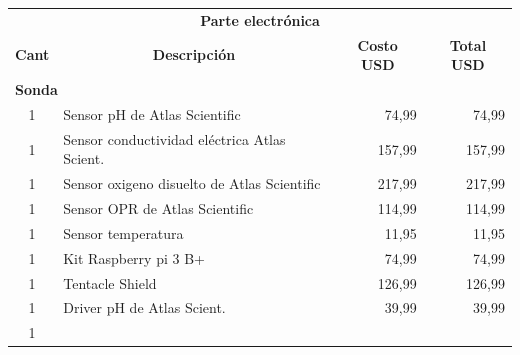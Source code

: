 \begin{table}[t]
\begin{tabular}{c l c c}
\hline
\multicolumn{4}{c}{\textbf{Parte electrónica}}  \\
\multicolumn{1}{r}{\textbf{Cant}}                 & 
\multicolumn{1}{c}{\textbf{Descripción}}           & 
\multicolumn{1}{c}{\textbf{Costo USD}}             & 
\multicolumn{1}{c}{\textbf{Total USD}} \\ 
\hline
\multicolumn{2}{l}{\textbf{Sonda}}                & 
\multicolumn{2}{c}{}                                                             \\ 
\hline
\multicolumn{1}{c}{1}                             & 
\multicolumn{1}{l}{Sensor pH de Atlas Scientific}  & 
\multicolumn{1}{r}{74,99}                          & 
\multicolumn{1}{r}{74,99}              \\ 
\multicolumn{1}{c}{1}                             & 
\multicolumn{1}{l}{Sensor conductividad eléctrica Atlas Scient.} & 
\multicolumn{1}{r}{157,99}                         & 
\multicolumn{1}{r}{157,99}             \\ 
\multicolumn{1}{c}{1}                             & 
\multicolumn{1}{l}{Sensor oxigeno disuelto de Atlas Scientific}    & 
\multicolumn{1}{r}{217,99}                         & 
\multicolumn{1}{r}{217,99}             \\ 
\multicolumn{1}{c}{1}                             & 
\multicolumn{1}{l}{Sensor OPR de Atlas Scientific} & 
\multicolumn{1}{r}{114,99}                         & 
\multicolumn{1}{r}{114,99}             \\ 
\multicolumn{1}{c}{1}                             & 
\multicolumn{1}{l}{Sensor temperatura}             & 
\multicolumn{1}{r}{11,95}                          & 
\multicolumn{1}{r}{11,95}              \\ 
\multicolumn{1}{c}{1}                             & 
\multicolumn{1}{l}{Kit Raspberry pi 3 B+}          & 
\multicolumn{1}{r}{74,99}                          & 
\multicolumn{1}{r}{74,99}              \\ 
\multicolumn{1}{c}{1}                             & 
\multicolumn{1}{l}{Tentacle Shield}                & 
\multicolumn{1}{r}{126,99}                         & 
\multicolumn{1}{r}{126,99}             \\ 
\multicolumn{1}{c}{1}                             & 
\multicolumn{1}{l}{Driver pH de Atlas Scient.}     & 
\multicolumn{1}{r}{39,99}                          & 
\multicolumn{1}{r}{39,99}              \\ 
\multicolumn{1}{c}{1}                             & 

\end{tabular}
\end{table}
